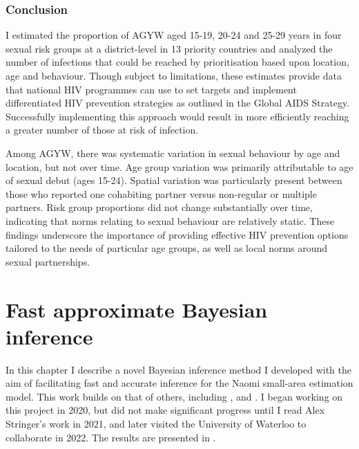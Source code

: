 \documentclass[a4paper, nobind]{templates/ociamthesis}
\begin{document}
\hypertarget{conclusion-1}{%
\subsection{Conclusion}\label{conclusion-1}}

I estimated the proportion of AGYW aged 15-19, 20-24 and 25-29 years in four sexual risk groups at a district-level in 13 priority countries and analyzed the number of infections that could be reached by prioritisation based upon location, age and behaviour.
Though subject to limitations, these estimates provide data that national HIV programmes can use to set targets and implement differentiated HIV prevention strategies as outlined in the Global AIDS Strategy.
Successfully implementing this approach would result in more efficiently reaching a greater number of those at risk of infection.

Among AGYW, there was systematic variation in sexual behaviour by age and location, but not over time.
Age group variation was primarily attributable to age of sexual debut (ages 15-24).
Spatial variation was particularly present between those who reported one cohabiting partner versus non-regular or multiple partners.
Risk group proportions did not change substantially over time, indicating that norms relating to sexual behaviour are relatively static.
These findings underscore the importance of providing effective HIV prevention options tailored to the needs of particular age groups, as well as local norms around sexual partnerships.

\hypertarget{naomi-aghq}{%
\chapter{Fast approximate Bayesian inference}\label{naomi-aghq}}

\adjustmtc
{}

In this chapter I describe a novel Bayesian inference method I developed with the aim of facilitating fast and accurate inference for the Naomi small-area estimation model.
This work builds on that of others, including \textcite{rue2009approximate}, \textcite{kristensen2016tmb} and \textcite{stringer2021fast}.
I began working on this project in 2020, but did not make significant progress until I read Alex Stringer's work in 2021, and later visited the University of Waterloo to collaborate in 2022.
The results are presented in \textcite{howes2023fast}.
\end{document}
